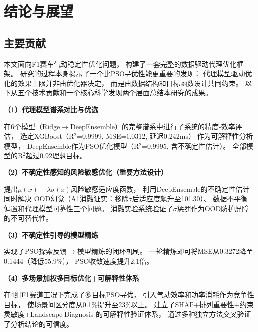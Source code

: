 \section{结论与展望}

\subsection{主要贡献}

本文面向F1赛车气动稳定性优化问题，
构建了一套完整的数据驱动代理优化框架。
研究的过程本身揭示了一个比PSO寻优性能更重要的发现：
代理模型驱动优化的效果上限并非由优化器决定，
而是由数据结构和目标函数设计共同约束。
以下从五个技术贡献和一个核心科学发现两个层面总结本研究的成果。

\vspace{0.2cm}


\vspace{0.3cm}

\noindent
\textbf{（1）代理模型谱系对比与优选}

在6个模型（Ridge$\to$DeepEnsemble）的完整谱系中进行了系统的精度-效率评估，
选定XGBoost（R$^2$=0.9999, MSE=0.0312, 延迟0.242ms）
作为可解释性分析模型，
DeepEnsemble作为PSO优化模型（R$^2$=0.9995, 含不确定性估计）。
全部模型的R$^2$超过0.92理想目标。

\vspace{0.3cm}

\noindent
\textbf{（2）不确定性感知的风险敏感优化（重要方法设计）}

提出$\mu(x) - \lambda\sigma(x)$风险敏感适应度函数，
利用DeepEnsemble的不确定性估计同时解决
OOD幻觉（A1消融证实：移除$\sigma$后适应度飙升至101.30）、
数据不平衡偏置和代理模型可靠性三个问题。
消融实验系统验证了$\sigma$惩罚作为OOD防护屏障的不可替代性。

\vspace{0.3cm}

\noindent
\textbf{（3）不确定性引导的模型精炼}

实现了PSO探索反馈$\to$模型精炼的闭环机制。
一轮精炼即可将MSE从0.3272降至0.1444（降低55.9\%），
PSO收敛速度提升2.1倍。

\vspace{0.3cm}

\noindent
\textbf{（4）多场景加权多目标优化+可解释性体系}

在4组F1赛道工况下完成了多目标PSO寻优，
引入气动效率和功率消耗作为竞争性目标，
使场景间区分度从0.1\%提升至23\%以上。
建立了SHAP+排列重要性+约束灵敏度+Landscape Diagnosis
的可解释性验证体系，
通过多种独立方法交叉验证了分析结论的可信度。

